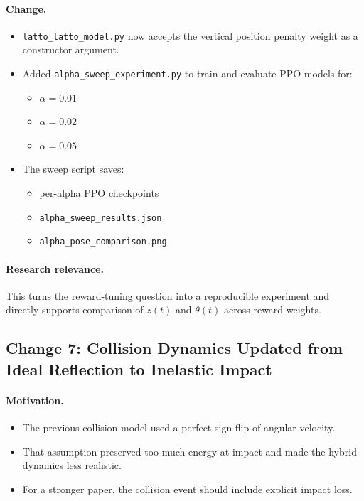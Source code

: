 \documentclass[11pt]{article}
\begin{document}
\paragraph{Change.}
\begin{itemize}[leftmargin=1.5em]
  \item \texttt{latto\_latto\_model.py} now accepts the vertical position penalty weight as a constructor argument.
  \item Added \texttt{alpha\_sweep\_experiment.py} to train and evaluate PPO models for:
  \begin{itemize}[leftmargin=1.5em]
    \item $\alpha = 0.01$
    \item $\alpha = 0.02$
    \item $\alpha = 0.05$
  \end{itemize}
  \item The sweep script saves:
  \begin{itemize}[leftmargin=1.5em]
    \item per-alpha PPO checkpoints
    \item \texttt{alpha\_sweep\_results.json}
    \item \texttt{alpha\_pose\_comparison.png}
  \end{itemize}
\end{itemize}

\paragraph{Research relevance.}
This turns the reward-tuning question into a reproducible experiment and directly supports comparison of $z(t)$ and $\theta(t)$ across reward weights.

\subsection*{Change 7: Collision Dynamics Updated from Ideal Reflection to Inelastic Impact}

\paragraph{Motivation.}
\begin{itemize}[leftmargin=1.5em]
  \item The previous collision model used a perfect sign flip of angular velocity.
  \item That assumption preserved too much energy at impact and made the hybrid dynamics less realistic.
  \item For a stronger paper, the collision event should include explicit impact loss.
\end{itemize}
\end{document}
